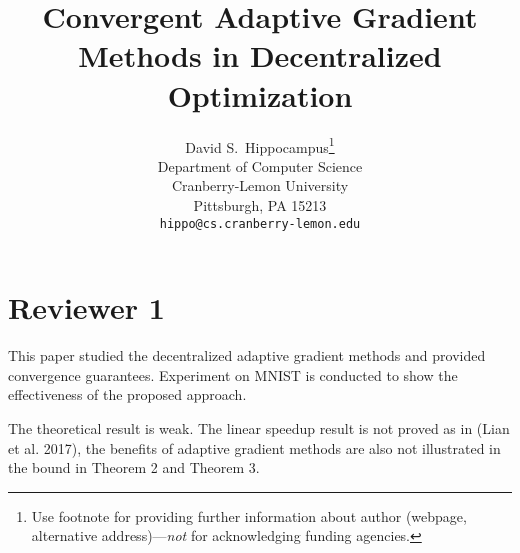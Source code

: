\documentclass{article} %
\title{Convergent Adaptive Gradient Methods in Decentralized Optimization\vspace{-0.15in}}
\begin{document}
\maketitle


\author{%
  David S.~Hippocampus\thanks{Use footnote for providing further information
    about author (webpage, alternative address)---\emph{not} for acknowledging
    funding agencies.} \\
  Department of Computer Science\\
  Cranberry-Lemon University\\
  Pittsburgh, PA 15213 \\
  \texttt{hippo@cs.cranberry-lemon.edu} \\
}





\section{Reviewer 1}
\vspace{-0.1in}

This paper studied the decentralized adaptive gradient methods and provided convergence guarantees. Experiment on MNIST is conducted to show the effectiveness of the proposed approach.

The theoretical result is weak. The linear speedup result is not proved as in (Lian et al. 2017), the benefits of adaptive gradient methods are also not illustrated in the bound in Theorem 2 and Theorem 3.
\end{document}
